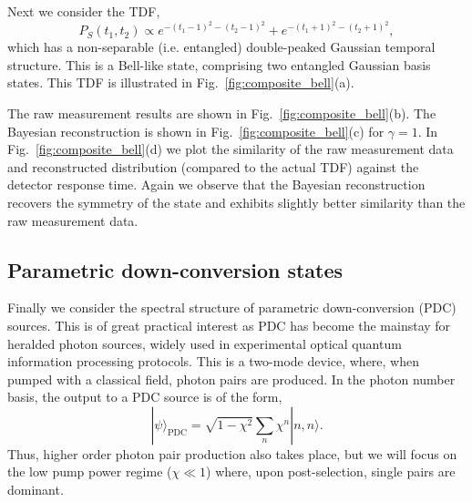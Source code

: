 \documentclass[aps,pra,twocolumn,amsmath,amssymb,color,superscriptaddress]{revtex4}
\newcommand{\ket}[1]{|#1\rangle}
\begin{document}
Next we consider the TDF,
\begin{equation} \label{eq:spectral_gaussian}
P_S(t_{1}, t_{2}) \propto e^{-(t_{1}-1)^{2}-(t_{2}-1)^{2}} + e^{-(t_{1}+1)^{2}-(t_{2}+1)^{2}},
\end{equation}
which has a non-separable (i.e. entangled) double-peaked Gaussian temporal structure. This is a Bell-like state, comprising two entangled Gaussian basis states. This TDF is illustrated in Fig.~\ref{fig:composite_bell}(a).

The raw measurement results are shown in Fig.~\ref{fig:composite_bell}(b). The Bayesian reconstruction is shown in Fig.~\ref{fig:composite_bell}(c) for \mbox{$\gamma=1$}.  In Fig.~\ref{fig:composite_bell}(d) we plot the similarity of the raw measurement data and reconstructed distribution (compared to the actual TDF) against the detector response time. Again we observe that the Bayesian reconstruction recovers the symmetry of the state and exhibits slightly better similarity than the raw measurement data.

%
%

\subsection{Parametric down-conversion states}

Finally we consider the spectral structure of parametric down-conversion (PDC) sources. This is of great practical interest as PDC has become the mainstay for heralded photon sources, widely used in experimental optical quantum information processing protocols. This is a two-mode device, where, when pumped with a classical field, photon pairs are produced. In the photon number basis, the output to a PDC source is of the form,
\begin{equation}
\ket{\psi}_\mathrm{PDC} = \sqrt{1-\chi^2} \sum_n \chi^n \ket{n,n}.
\end{equation}
Thus, higher order photon pair production also takes place, but we will focus on the low pump power regime (\mbox{$\chi\ll 1$}) where, upon post-selection, single pairs are dominant.
\end{document}
